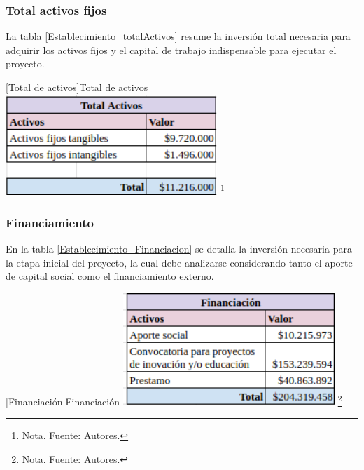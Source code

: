 \subsubsection{Total activos fijos}
La tabla \ref{Establecimiento_totalActivos} resume la inversión total necesaria para adquirir los activos fijos y el capital de trabajo indispensable para ejecutar el proyecto.

\vspace{2mm}
\begin{minipage}{0.9\textwidth}
\centering
{}[Total de activos]{Total de activos}
\label{Establecimiento_totalActivos}
\includegraphics[width=0.6\textwidth]{Content/Images/AF/Establecimiento_totalActivos.png}
\footnote{Nota. \textup{Fuente: Autores.}}
\end{minipage}

\subsubsection{Financiamiento}
En la tabla \ref{Establecimiento_Financiacion} se detalla la inversión necesaria para la etapa inicial del proyecto, la cual debe analizarse considerando tanto el aporte de capital social como el financiamiento externo.

\vspace{2mm}
\begin{minipage}{0.9\textwidth}
\centering
{}[Financiación]{Financiación}
\label{Establecimiento_Financiacion}
\includegraphics[width=0.6\textwidth]{Content/Images/AF/Establecimiento_Financiacion.png}
\footnote{Nota. \textup{Fuente: Autores.}}
\end{minipage}
